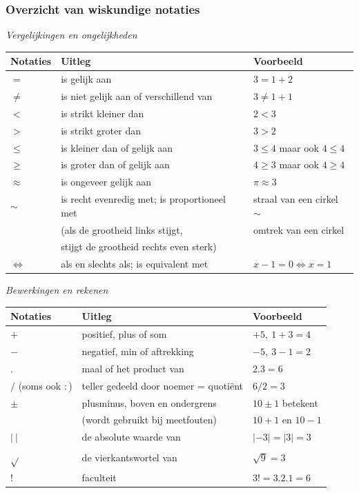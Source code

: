 \subsubsection{Overzicht van wiskundige notaties}

\emph{Vergelijkingen en ongelijkheden}

\begin{center}
	\begin{tabular}{lll}
	Notaties & Uitleg & Voorbeeld \\
	\hline
	$=$ & is gelijk aan & $3=1+2$ \\
	$\ne$ & is niet gelijk aan of verschillend van & $3\ne1+1$ \\
	$<$ & is strikt kleiner dan & $2<3$ \\
	$>$ & is strikt groter dan & $3>2$ \\
	$\le$ & is kleiner dan of gelijk aan & $3\le 4$ maar ook $4\le 4$ \\
	$\ge$ & is groter dan of gelijk aan & $4\ge 3$ maar ook $4\ge 4$ \\
	$\approx$ & is ongeveer gelijk aan & $\pi \approx 3$ \\
	$\sim$ & is recht evenredig met; is proportioneel met & straal van een cirkel $\sim$ \\
	& (als de grootheid links stijgt, & omtrek van een cirkel \\
	& stijgt de grootheid rechts even sterk) & \\
	$\iff$ & als en slechts als; is equivalent met & $x-1=0 \iff x=1$ \\
	\end{tabular}
\end{center}

\emph{Bewerkingen en rekenen}

\begin{center}
	\begin{tabular}{lll}
		Notaties & Uitleg & Voorbeeld \\
		\hline
		$+$ & positief, plus of som & $+5, \ 1+3=4$ \\
		$-$ & negatief, min of aftrekking & $-5,\ 3-1=2$ \\
		$.$ & maal of het product van & $2.3=6$ \\
		$/$ (soms ook $:$) & teller gedeeld door noemer = quoti\"ent & $6/2=3$ \\
		$\pm$ & plusminus, boven en ondergrens & $10 \pm 1$ betekent  \\
		& (wordt gebruikt bij meetfouten) & $10+1$ en $10-1$ \\
		$| \ |$ & de absolute waarde van & $|-3|=|3|=3$ \\
		$\sqrt{ }$ & de vierkantswortel van & $\sqrt{9}=3$ \\
		$!$ & faculteit & $3!=3.2.1=6$
	\end{tabular}
\end{center}

